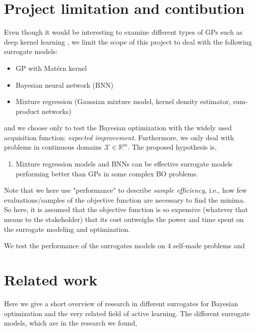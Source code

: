  \section{Project limitation and contibution}
Even though it would be interesting to examine different types of GPs such as deep kernel
learning \cite{deepkernel}, we limit the scope of this project to deal with the following surrogate models:
\begin{itemize}[noitemsep]
    \item GP with Matérn kernel
    \item Bayesian neural network (BNN)
    \item Mixture regression (Gaussian mixture model, kernel density estimator, sum-product networks)
\end{itemize}
and we choose only to test the Bayesian optimization with the widely used acquisition function:
\textit{expected improvement}. Furthermore, we only deal with problems in continuous domains
$\mathcal{X} \in \mathbb{R}^m$. The proposed hypothesis is,

\begin{enumerate}[noitemsep]
    \item Mixture regression models and BNNs can be effective surrogate models
    performing better than GPs in some complex BO problems. 
\end{enumerate}

Note that we here use "performance" to describe \textit{sample efficiency}, i.e., how few evaluations/samples
of the objective function are necessary to find the minima. So here, it is assumed that the objective
function is so expensive (whatever that means to the stakeholder) that its cost outweighs the power
and time spent on the surrogate modeling and optimization.


We test the performance of the surrogates models on 4 self-made problems and 

    

\section{Related work}
Here we give a short overview of research in different surrogates for Bayesian optimization
and the very related field of active learning. The different surrogate models, which are in the 
research we found, 

